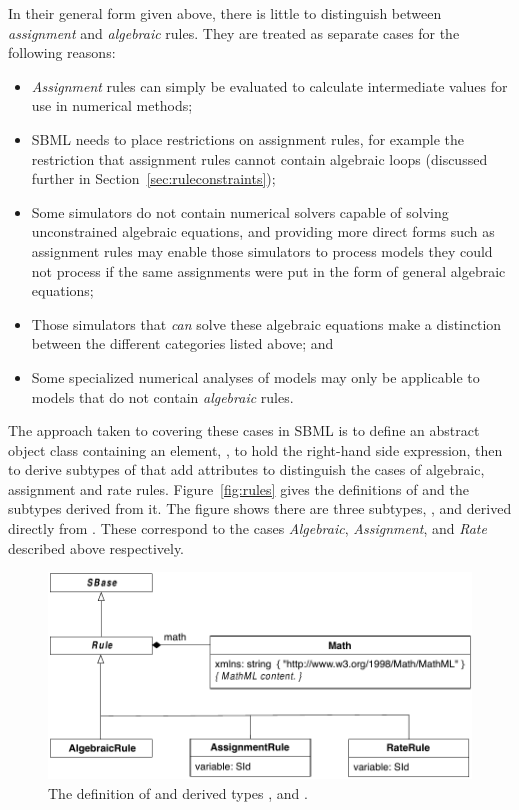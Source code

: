 In their general form given above, there is little to distinguish
between \emph{assignment} and \emph{algebraic} rules.  They are
treated as separate cases for the following reasons:
\begin{itemize}
  
\item \emph{Assignment} rules can simply be evaluated to calculate
  intermediate values for use in numerical methods;
  
\item SBML needs to place restrictions on assignment rules, for
  example the restriction that assignment rules cannot contain
  algebraic loops (discussed further in
  Section~\ref{sec:ruleconstraints});

\item Some simulators do not contain numerical solvers capable of
  solving unconstrained algebraic equations, and providing more
  direct forms such as assignment rules may enable those
  simulators to process models they could not process if the same
  assignments were put in the form of general algebraic equations;
  
\item Those simulators that \emph{can} solve these algebraic
  equations make a distinction between the different categories
  listed above; and
  
\item Some specialized numerical analyses of models may only be
  applicable to models that do not contain \emph{algebraic} rules.

\end{itemize}

The approach taken to covering these cases in SBML is to define an
abstract \Rule object class containing an element,
, to hold the right-hand side expression, then to
derive subtypes of \Rule that add attributes to
distinguish the cases of algebraic, assignment and rate rules.
Figure~\vref{fig:rules} gives the definitions of \Rule and the
subtypes derived from it.  The figure shows there are three
subtypes, \AlgebraicRule, \AssignmentRule and \RateRule derived
directly from \Rule. These correspond to the cases
\emph{Algebraic}, \emph{Assignment}, and \emph{Rate} described
above respectively.

\begin{figure}[htb]
  \centering
  \includegraphics[scale=0.8]{figs/rule-uml}
  \caption{The definition of \Rule and derived types
      \AlgebraicRule, \AssignmentRule and \RateRule.}
  \label{fig:rules}
\end{figure}


